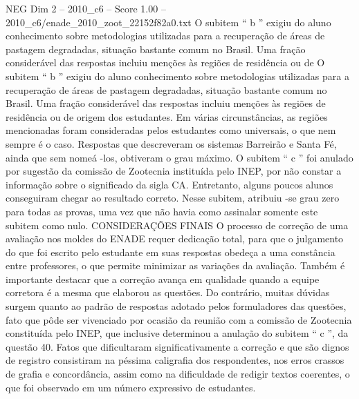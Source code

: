 \begin{textsample}{NEG Dim 2 – 2010\_c6 – Score 1.00 – 2010\_c6/enade\_2010\_zoot\_22152f82a0.txt}
O subitem “ b ” exigiu do aluno conhecimento sobre metodologias utilizadas para a recuperação de áreas de pastagem degradadas, situação bastante comum no Brasil.
Uma fração considerável das respostas incluiu menções às regiões de residência ou de O subitem “ b ” exigiu do aluno conhecimento sobre metodologias utilizadas para a recuperação de áreas de pastagem degradadas, situação bastante comum no Brasil.
Uma fração considerável das respostas incluiu menções às regiões de residência ou de origem dos estudantes.
Em várias circunstâncias, as regiões mencionadas foram consideradas pelos estudantes como universais, o que nem sempre é o caso.
Respostas que descreveram os sistemas Barreirão e Santa Fé, ainda que sem nomeá -los, obtiveram o grau máximo.
O subitem “ c ” foi anulado por sugestão da comissão de Zootecnia instituída pelo INEP, por não constar a informação sobre o significado da sigla CA.
Entretanto, alguns poucos alunos conseguiram chegar ao resultado correto.
Nesse subitem, atribuiu -se grau zero para todas as provas, uma vez que não havia como assinalar somente este subitem como nulo.
CONSIDERAÇÕES FINAIS O processo de correção de uma avaliação nos moldes do ENADE requer dedicação total, para que o julgamento do que foi escrito pelo estudante em suas respostas obedeça a uma constância entre professores, o que permite minimizar as variações da avaliação.
Também é importante destacar que a correção avança em qualidade quando a equipe corretora é a mesma que elaborou as questões.
Do contrário, muitas dúvidas surgem quanto ao padrão de respostas adotado pelos formuladores das questões, fato que pôde ser vivenciado por ocasião da reunião com a comissão de Zootecnia constituída pelo INEP, que inclusive determinou a anulação do subitem “ c ”, da questão 40.
Fatos que dificultaram significativamente a correção e que são dignos de registro consistiram na péssima caligrafia dos respondentes, nos erros crassos de grafia e concordância, assim como na dificuldade de redigir textos coerentes, o que foi observado em um número expressivo de estudantes.

\end{textsample}
